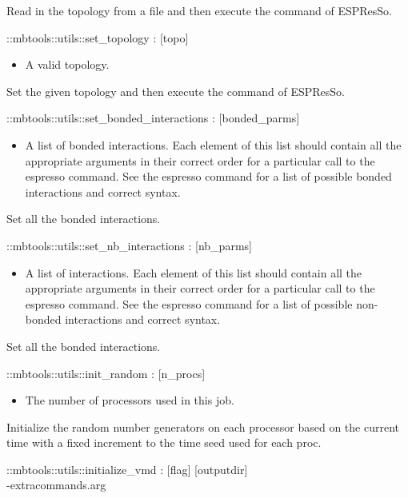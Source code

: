 Read in the topology from a file and then execute the  command of ESPResSo.
\begin{code}
  ::mbtools::utils::set_topology : [topo]
\end{code}
\begin{itemize}
\item {} A valid topology.
\end{itemize}
Set the given topology and then execute the  command of ESPResSo.
\begin{code}
  ::mbtools::utils::set_bonded_interactions : [bonded_parms]
\end{code}
\begin{itemize}
\item {} A list of bonded interactions. Each element of this list should contain all the appropriate arguments in their correct order for a particular call to the espresso  command. See the espresso  command for a list of possible bonded interactions and correct syntax.
\end{itemize}
Set all the bonded interactions.
\begin{code}
  ::mbtools::utils::set_nb_interactions : [nb_parms]
\end{code}
\begin{itemize}
\item {} A list of interactions. Each element of this list should contain all the appropriate arguments in their correct order for a particular call to the espresso  command. See the espresso  command for a list of possible non-bonded interactions and correct syntax.
\end{itemize}
Set all the bonded interactions.
\begin{code}
  ::mbtools::utils::init_random : [n_procs]
\end{code}
\begin{itemize}
\item {} The number of processors used in this job.
\end{itemize}
Initialize the random number generators on each processor based on the current time with a fixed increment to the time seed used for each proc.
\begin{code}
  ::mbtools::utils::initialize_vmd : [flag] [outputdir]\\
             [ident] -extracommands.arg
\end{code}
